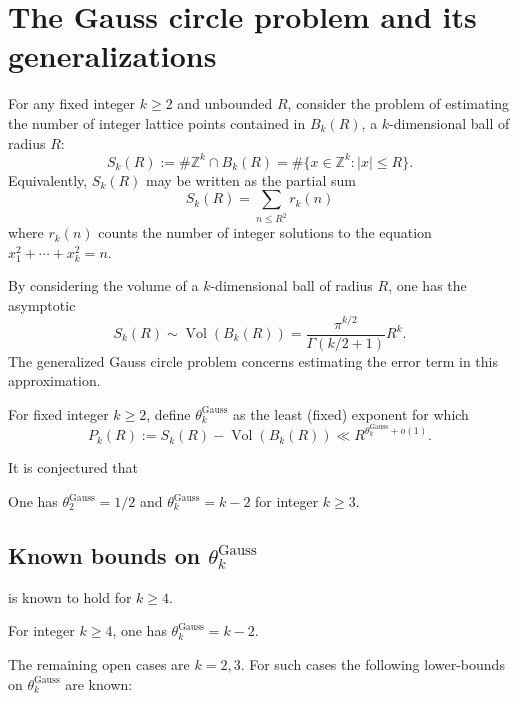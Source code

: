 \chapter{The Gauss circle problem and its generalizations}\label{gauss-circle-chapter}

\unintegrated

For any fixed integer $k \ge 2$ and unbounded $R$, consider the problem of estimating the number of integer lattice points contained in $B_k(R)$, a $k$-dimensional ball of radius $R$:
\[
S_k(R) := \# \mathbb{Z}^k \cap B_k(R) = \# \{x \in \mathbb{Z}^k: |x| \le R\}.
\]
Equivalently, $S_k(R)$ may be written as the partial sum 
\[
S_k(R) = \sum_{n \le R^{2}}r_k(n)
\]
where $r_k(n)$ counts the number of integer solutions to the equation $x_1^2 + \cdots + x_k^2 = n$.

By considering the volume of a $k$-dimensional ball of radius $R$, one has the asymptotic
\[
S_k(R) \sim \operatorname{Vol}(B_k(R)) = \frac{\pi^{k/2}}{\Gamma(k/2 + 1)}R^k.
\]
The generalized Gauss circle problem concerns estimating the error term in this approximation.

\begin{definition}
For fixed integer $k \ge 2$, define $\theta^{\operatorname{Gauss}}_{k}$ as the least (fixed) exponent for which
\[
P_k(R) := S_k(R) - \operatorname{Vol}(B_k(R)) \ll R^{\theta^{\operatorname{Gauss}}_{k} + o(1)}.
\]
\end{definition}

It is conjectured that 

\begin{conjecture}\label{gauss-circle-conj}
One has $\theta^{\operatorname{Gauss}}_{2} = 1/2$ and $\theta^{\operatorname{Gauss}}_{k} = k - 2$ for integer $k \ge 3$.
\end{conjecture}


\section{Known bounds on $\theta^{\operatorname{Gauss}}_k$}

 is known to hold for $k \ge 4$. 

\begin{theorem}
For integer $k \ge 4$, one has $\theta^{\operatorname{Gauss}}_{k} = k - 2$.
\end{theorem}

The remaining open cases are $k = 2, 3$. For such cases the following lower-bounds on $\theta^{\operatorname{Gauss}}_{k}$ are known:

